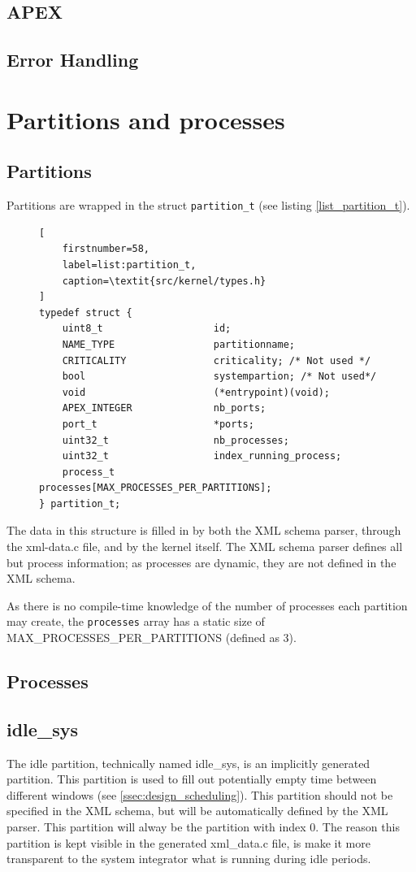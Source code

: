 \subsection{APEX}

\subsection{Error Handling}

\section{Partitions and processes}

\subsection{Partitions}
Partitions are wrapped in the struct \texttt{partition_t} (see listing
\ref{list_partition_t}).
\begin{figure}
\begin{lstlisting}[
	firstnumber=58,
	label=list:partition_t,
	caption=\textit{src/kernel/types.h}
]
typedef struct {
    uint8_t                   id;
    NAME_TYPE                 partitionname;
    CRITICALITY	              criticality; /* Not used */
    bool                      systempartion; /* Not used*/
    void                      (*entrypoint)(void);
    APEX_INTEGER              nb_ports;
    port_t                    *ports;
    uint32_t                  nb_processes;
    uint32_t                  index_running_process;
    process_t                 processes[MAX_PROCESSES_PER_PARTITIONS];
} partition_t;
\end{lstlisting}
\end{figure} 
The data in this structure is filled in by both the
XML schema parser, through the xml-data.c file, and by the kernel itself.
The XML schema parser defines all but process information; as processes are
dynamic, they are not defined in the XML schema.

As there is no compile-time knowledge of the number of processes each partition
may create, the \texttt{processes} array has a static size of 
MAX\_PROCESSES\_PER\_PARTITIONS (defined as 3).
\subsection{Processes}

\subsection{idle\_sys}
\label{ssec:idle_part}
The idle partition, technically named idle\_sys, is an implicitly generated
partition. This partition is used to fill out potentially empty time between
different windows (see \ref{ssec:design_scheduling}). This partition should not
be specified in the XML schema, but will be automatically defined by the XML
parser. This partition will alway be the partition with index 0. The reason this
partition is kept visible in the generated xml\_data.c file, is make it more
transparent to the system integrator what is running during idle periods.\\

